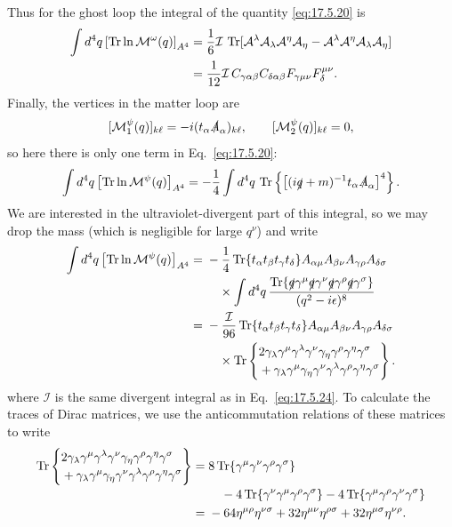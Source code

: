Thus for the ghost loop the integral of the quantity \eqref{eq:17.5.20} is
\begin{align}
\int d^4q\left[\operatorname{Tr}\ln\mathcal M^\omega(q)\right]_{A^4}
={}&\frac16\mathcal I\,\operatorname{Tr}
[\mathcal A^\lambda\mathcal A_\lambda\mathcal A^\eta\mathcal A_\eta
-\mathcal A^\lambda\mathcal A^\eta\mathcal A_\lambda\mathcal A_\eta]
\notag\\
={}&\frac1{12}\mathcal I\,C_{\gamma\alpha\beta}C_{\delta\alpha\beta}
F_{\gamma\mu\nu}F_\delta^{\mu\nu}.
\label{eq:17.5.28}
\end{align}
Finally, the vertices in the matter loop are
\[
[\mathcal M_1^\psi(q)]_{k\ell}=-i(t_\alpha\sl A_\alpha)_{k\ell},
\qquad
[\mathcal M_2^\psi(q)]_{k\ell}=0,
\]
so here there is only one term in Eq.~\eqref{eq:17.5.20}:
\[
\int d^4q\left[\operatorname{Tr}\ln\mathcal M^\psi(q)\right]_{A^4}
=-\frac14\int d^4q\,\operatorname{Tr}
\left\{\left[(i\sl q+m)^{-1}t_\alpha\sl A_\alpha\right]^4\right\}.
\]
We are interested in the ultraviolet-divergent part of this integral, so we
may drop the mass (which is negligible for large $q^\nu$) and write
\begin{align}
\int d^4q\left[\operatorname{Tr}\ln\mathcal M^\psi(q)\right]_{A^4}
={}&-\frac14\operatorname{Tr}\{t_\alpha t_\beta t_\gamma t_\delta\}
A_{\alpha\mu}A_{\beta\nu}A_{\gamma\rho}A_{\delta\sigma}
\notag\\[-2pt]
&\quad\times
\int d^4q\,
\frac{\operatorname{Tr}\{\sl q\gamma^\mu\sl q\gamma^\nu
\sl q\gamma^\rho\sl q\gamma^\sigma\}}{(q^2-i\epsilon)^8}
\notag\\
={}&-\frac{\mathcal I}{96}\operatorname{Tr}\{t_\alpha t_\beta t_\gamma t_\delta\}
A_{\alpha\mu}A_{\beta\nu}A_{\gamma\rho}A_{\delta\sigma}
\notag\\
&\quad\times\operatorname{Tr}\left\{
\begin{aligned}
&2\gamma_\lambda\gamma^\mu\gamma^\lambda\gamma^\nu
 \gamma_\eta\gamma^\rho\gamma^\eta\gamma^\sigma\\[-2pt]
&+\gamma_\lambda\gamma^\mu\gamma_\eta\gamma^\nu
 \gamma^\lambda\gamma^\rho\gamma^\eta\gamma^\sigma
\end{aligned}\right\}.
\label{eq:17.5.29}
\end{align}
where $\mathcal I$ is the same divergent integral as in Eq.~\eqref{eq:17.5.24}.
To calculate the traces of Dirac matrices, we use the anticommutation
relations of these matrices to write
\begin{align*}
\operatorname{Tr}\left\{\begin{aligned}
&2\gamma_\lambda\gamma^\mu\gamma^\lambda\gamma^\nu
 \gamma_\eta\gamma^\rho\gamma^\eta\gamma^\sigma\\[-2pt]
&+\gamma_\lambda\gamma^\mu\gamma_\eta\gamma^\nu
 \gamma^\lambda\gamma^\rho\gamma^\eta\gamma^\sigma
\end{aligned}\right\}
={}&8\operatorname{Tr}\{\gamma^\mu\gamma^\nu\gamma^\rho\gamma^\sigma\}
\notag\\[-2pt]
&\quad-4\operatorname{Tr}\{\gamma^\nu\gamma^\mu\gamma^\rho\gamma^\sigma\}
-4\operatorname{Tr}\{\gamma^\mu\gamma^\rho\gamma^\nu\gamma^\sigma\}\\
={}&-64\eta^{\mu\rho}\eta^{\nu\sigma}
+32\eta^{\mu\nu}\eta^{\rho\sigma}
+32\eta^{\mu\sigma}\eta^{\nu\rho}.
\end{align*}
